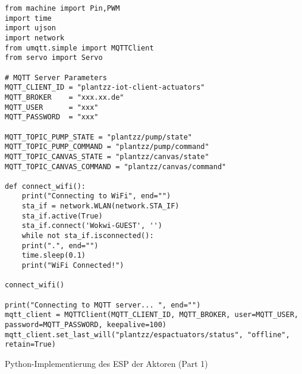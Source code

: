 \begin{listing}[!ht]
\begin{verbatim}
from machine import Pin,PWM
import time
import ujson
import network
from umqtt.simple import MQTTClient 
from servo import Servo

# MQTT Server Parameters
MQTT_CLIENT_ID = "plantzz-iot-client-actuators"
MQTT_BROKER    = "xxx.xx.de"
MQTT_USER      = "xxx"
MQTT_PASSWORD  = "xxx"

MQTT_TOPIC_PUMP_STATE = "plantzz/pump/state"
MQTT_TOPIC_PUMP_COMMAND = "plantzz/pump/command"
MQTT_TOPIC_CANVAS_STATE = "plantzz/canvas/state"
MQTT_TOPIC_CANVAS_COMMAND = "plantzz/canvas/command"

def connect_wifi():
    print("Connecting to WiFi", end="")
    sta_if = network.WLAN(network.STA_IF)
    sta_if.active(True)
    sta_if.connect('Wokwi-GUEST', '')
    while not sta_if.isconnected():
    print(".", end="")
    time.sleep(0.1)
    print("WiFi Connected!")

connect_wifi()

print("Connecting to MQTT server... ", end="")
mqtt_client = MQTTClient(MQTT_CLIENT_ID, MQTT_BROKER, user=MQTT_USER, password=MQTT_PASSWORD, keepalive=100)
mqtt_client.set_last_will("plantzz/espactuators/status", "offline", retain=True)
\end{verbatim}
\caption{Python-Implementierung des ESP der Aktoren (Part 1)}
\label{list:wokwi_aktoren1}
\end{listing}

